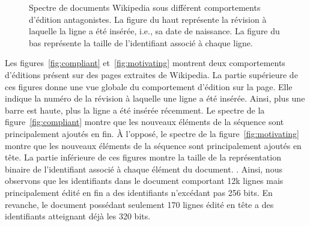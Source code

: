 \begin{figure}
  \centering
  \hspace{10pt}
  \caption{\label{fig:allocation}Spectre de documents Wikipedia sous différent
    comportements d'édition antagonistes. La figure du haut représente la
    révision à laquelle la ligne a été insérée, i.e., sa date de naissance.  La
    figure du bas représente la taille de l'identifiant associé à chaque ligne.}
\end{figure}

Les figures~\ref{fig:compliant} et~\ref{fig:motivating} montrent deux
comportements d'éditions présent sur des pages extraites de Wikipedia. La partie
supérieure de ces figures donne une vue globale du comportement d'édition sur la
page. Elle indique la numéro de la révision à laquelle une ligne a été
insérée. Ainsi, plus une barre est haute, plus la ligne a été insérée
récemment. Le spectre de la figure~\ref{fig:compliant} montre que les nouveaux
éléments de la séquence sont principalement ajoutés en fin. À l'opposé, le
spectre de la figure~\ref{fig:motivating} montre que les nouveaux éléments de la
séquence sont principalement ajoutés en tête. La partie inférieure de ces
figures montre la taille de la représentation binaire de l'identifiant associé à
chaque élément du document. . Ainsi,
nous observons que les identifiants dans le document comportant 12k lignes mais
principalement édité en fin a des identifiants n'excédant pas 256 bits. En
revanche, le document possédant seulement 170 lignes édité en tête a des
identifiants atteignant déjà les 320 bits.


